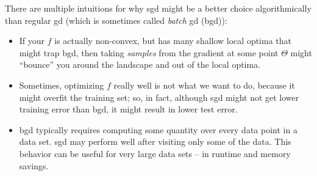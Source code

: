 \documentclass[11pt]{article}
\begin{document}
There are multiple intuitions for why {\sc sgd} might be a better choice
algorithmically than regular {\sc gd} (which is sometimes called {\em
  batch} {\sc gd} ({\sc bgd})):  
\begin{itemize}
\item If your $f$ is actually non-convex, but has many shallow local
  optima that might trap {\sc bgd}, then taking {\em samples} from the
  gradient at some point $\Theta$ might ``bounce'' you around the
  landscape and out of the local optima.
\item Sometimes, optimizing $f$ really well is not what we want to do,
  because it might overfit the training set;  so, in fact, although
  {\sc sgd} might not get lower training error than {\sc bgd}, it
  might result in lower test error.
\item {\sc bgd} typically requires computing some quantity over every
data point in a data set. {\sc sgd} may perform well after visiting only
some of the data. This behavior can be useful for very large data sets --
in runtime and memory savings.
\end{itemize}
\end{document}
